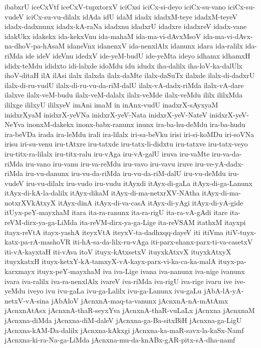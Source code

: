 {ibabxrU
iceCxVtf
iceCxV-tupxtorxV
iciCxsi
iciCx-si-deyo
iciCx-su-vano
iciCx-su-vudeV
iciCx-su-vu-dilalx
idAda
idU
idaM
idadx
idadxM-teye
idadxM-teyeV
idadx-dadxnunx
idadx-kA-raNa
idadxnu
idadxrU
idadxre
idadxreV
idadx-vane
idakUkx
idakekx
ida-kekxVnu
ida-mahaM
ida-ma-vi-dAvxMsoV
ida-ma-vi-dAvx-na-dhoV-pa-hAsaM
idaneVnx
idanenxV
ida-nenxlAlx
idanunx
idara
ida-ralilx
ida-riMda
ide
ideV
ideVnu
idedxV
ide-yeM-budU
ide-yeMta
ideyo
idhamx
idhamxH
ididx-teMdu
ididxto
idi-lalxde
idoMdu
idu
idudx
iha-dalilx
iha-loV-ka-dalUlx
ihoV-ditaH
ilA
ilAsi
ilalx
ilalxda
ilalx-daMte
ilalx-daSuTx
ilalxde
ilalx-di-dadxrU
ilalx-di-ru-vudU
ilalx-di-ru-vu-da-riM-dalU
ilalx-vA-dadx-riMda
ilalx-vA-dare
ilalxve
ilalx-veM-budu
ilalx-veM-dalalx
ilalx-veMde
ilalx-veMdu
ililx
ililxMda
ililxge
ililxyU
ililxyeV
imAni
imaM
in
inAnx-vudU
inadxrX-sAyxyaM
inidxrXyaM
inidxrX-yeVNa
inidxrX-yeV-Nata
inidxrX-yeV-NateV
inidxrX-yeV-NeYva
inonxM-dakekx
inonx-babx-ranunx
inunx
ira-ba-hu-deMdu
ira-ba-hudu
ira-beVDa
irada
ira-leMdu
irali
ira-lilalx
iri-sa-beVku
irisi
iri-si-koMDu
iri-soVNa
irisu
iri-su-venu
iru-tAtxre
iru-tatxde
iru-tatx-li-didxtu
iru-tatxve
iru-tatx-veyo
iru-titx-ra-lilalx
iru-titx-ralu
iru-vAga
iru-vA-galU
iruva
iru-vaMte
iru-va-da-riMda
iru-vano
iru-vanu
iru-va-reMdu
iru-vavo
iru-vavu
iruve
iru-ve-yA-dadx-riMda
iru-vu-danunx
iru-vu-da-riMda
iru-vu-da-riM-dalU
iru-vu-deMdu
iru-vudeV
iru-vu-dilalx
iru-vudo
iru-vudu
itAyxdi
itAyx-di-gaLa
itAyx-di-ga-Lanunx
itAyx-di-kA-la-dalilx
itAyx-dikaM
itAyx-di-ma-netxrXV-NAtha
itAyx-di-ma-notxrXVkAtxyX
itAyx-dinA
itAyx-di-va-casA
itAyx-di-yAgi
itAyx-di-yA-gide
itUyx-peY-mayxhaM
itara
ita-ra-ranunx
ita-ra-rigU
ita-ra-vA-gAdi
itare
ita-reVM-dirx-ya-ga-LiMda
ita-reVM-dirx-ya-ga-Lige
ita-reVSAM
itathxM
itayxpi
itayx-reVtA
itayx-yashA
iteyxVtA
iteyxV-ta-dadhxqq-dayeV
iti
itiVma
itiV-tuyx-katx-pa-rA-mashoVR
iti-hA-sa-da-lilx-ru-vAga
iti-parx-shanx-parx-ti-va-casetxV
iti-vA-kayxtaH
iti-vAva
itoV
ituyx-kAtxsetxV
ituyxkAtxvX
ituyxkAtxyX
ituyxkatxH
ituyx-ketxY-kA-tamxyX-vA-kayx-parx-vi-ka-ca-ka-malA
ituyx-pa-karxmayx
ituyx-peY-mayxhaM
iva
iva-Lige
ivana
iva-nanunx
iva-nige
ivanunx
ivara
iva-ralilx
iva-ra-nenxlAlx
ivareV
iva-riMda
iva-rigU
iva-rige
ivaru
ive
ive-yeMdu
iveyo
ivu
ivu-gaLa
ivu-ga-Lalilx
ivu-ga-Lanunx
ivu-gaLu
jAbA-lA-yA-netxV-vA-sina
jAbAloV
jAcnxnA-maq-ta-vanunx
jAcnxnA-nA-mAtAmx
jAcnxnAtAsx
jAcnxnA-thaR-seyxYva
jAcnxnA-thaR-vuLaLx
jAcnxna
jAcnxnaM
jAcnxna-diMda
jAcnxna-diM-daleV
jAcnxna-ga-Ba-sitxBiH
jAcnxna-ga-LigU
jAcnxna-kAM-Da-dalilx
jAcnxna-kAkxgi
jAcnxna-ka-maR-savx-la-kaSx-Namf
jAcnxna-ki-ra-Na-ga-LiMda
jAcnxna-mu-da-knABx-gAR-pitx-sA-dha-namf
}
